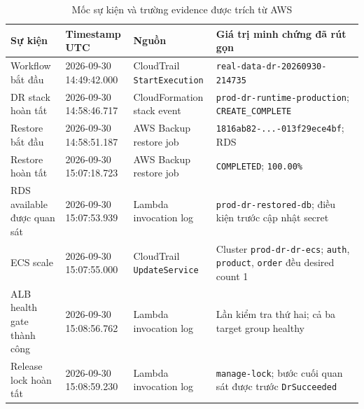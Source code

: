 \begin{table}[H]
\centering
\caption{Mốc sự kiện và trường evidence được trích từ AWS}
\label{tab:appendix-evidence-events}
\scriptsize
\begin{tabularx}{\textwidth}{@{}p{3.35cm}p{2.7cm}p{3.1cm}X@{}}
\toprule
\textbf{Sự kiện} & \textbf{Timestamp UTC} & \textbf{Nguồn} & \textbf{Giá trị minh chứng đã rút gọn} \\
\midrule
Workflow bắt đầu & 2026-09-30 14:49:42.000 & CloudTrail \texttt{StartExecution} & \texttt{real-data-dr-20260930-214735} \\
DR stack hoàn tất & 2026-09-30 14:58:46.717 & CloudFormation stack event & \texttt{prod-dr-runtime-production}; \texttt{CREATE\_COMPLETE} \\
Restore bắt đầu & 2026-09-30 14:58:51.187 & AWS Backup restore job & \texttt{1816ab82-...-013f29ece4bf}; RDS \\
Restore hoàn tất & 2026-09-30 15:07:18.723 & AWS Backup restore job & \texttt{COMPLETED}; \texttt{100.00\%} \\
RDS available được quan sát & 2026-09-30 15:07:53.939 & Lambda invocation log & \texttt{prod-dr-restored-db}; điều kiện trước cập nhật secret \\
ECS scale & 2026-09-30 15:07:55.000 & CloudTrail \texttt{UpdateService} & Cluster \texttt{prod-dr-dr-ecs}; \texttt{auth}, \texttt{product}, \texttt{order} đều desired count 1 \\
ALB health gate thành công & 2026-09-30 15:08:56.762 & Lambda invocation log & Lần kiểm tra thứ hai; cả ba target group healthy \\
Release lock hoàn tất & 2026-09-30 15:08:59.230 & Lambda invocation log & \texttt{manage-lock}; bước cuối quan sát được trước \texttt{DrSucceeded} \\
\bottomrule
\end{tabularx}
\end{table}

